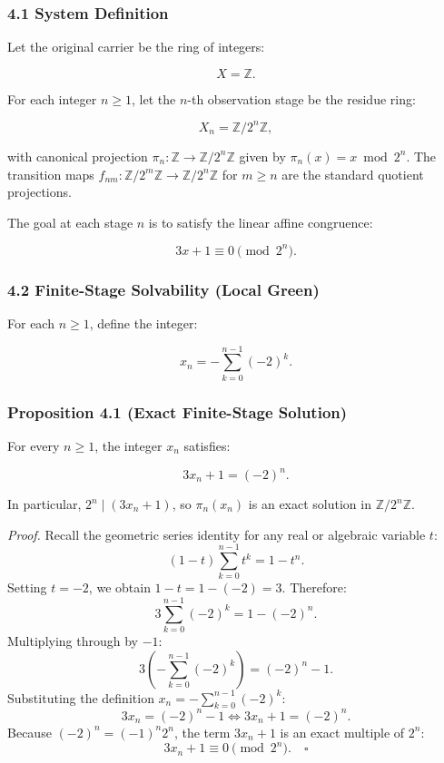 \documentclass[
  11pt,
]{article}
\theoremstyle{plain}
\theoremstyle{definition}\newtheorem{definition}[theorem]{Definition}
\theoremstyle{remark}\newtheorem*{remark}{Remark}
\begin{document}
\subsubsection{4.1 System Definition}\label{system-definition}

Let the original carrier be the ring of integers:

\[
X = \mathbb{Z}.
\]

For each integer \(n \ge 1\), let the \(n\)-th observation stage be the
residue ring:

\[
X_n = \mathbb{Z}/2^n\mathbb{Z},
\]

with canonical projection
\(\pi_n: \mathbb{Z} \to \mathbb{Z}/2^n\mathbb{Z}\) given by
\(\pi_n(x) = x \bmod 2^n\). The transition maps
\(f_{nm}: \mathbb{Z}/2^m\mathbb{Z} \to \mathbb{Z}/2^n\mathbb{Z}\) for
\(m \ge n\) are the standard quotient projections.

The goal at each stage \(n\) is to satisfy the linear affine congruence:

\[
3x + 1 \equiv 0 \pmod{2^n}.
\]

\subsubsection{4.2 Finite-Stage Solvability (Local
Green)}\label{finite-stage-solvability-local-green}

For each \(n \ge 1\), define the integer:

\[
x_n = -\sum_{k=0}^{n-1} (-2)^k.
\]

\subsubsection{Proposition 4.1 (Exact Finite-Stage
Solution)}\label{proposition-4.1-exact-finite-stage-solution}

For every \(n \ge 1\), the integer \(x_n\) satisfies:

\[
3x_n + 1 = (-2)^n.
\]

In particular, \(2^n \mid (3x_n + 1)\), so \(\pi_n(x_n)\) is an exact
solution in \(\mathbb{Z}/2^n\mathbb{Z}\).

\emph{Proof.} Recall the geometric series identity for any real or
algebraic variable \(t\): \[
(1 - t)\sum_{k=0}^{n-1} t^k = 1 - t^n.
\] Setting \(t = -2\), we obtain \(1 - t = 1 - (-2) = 3\). Therefore: \[
3 \sum_{k=0}^{n-1} (-2)^k = 1 - (-2)^n.
\] Multiplying through by \(-1\): \[
3 \left( -\sum_{k=0}^{n-1} (-2)^k \right) = (-2)^n - 1.
\] Substituting the definition \(x_n = -\sum_{k=0}^{n-1} (-2)^k\): \[
3x_n = (-2)^n - 1 \iff 3x_n + 1 = (-2)^n.
\] Because \((-2)^n = (-1)^n 2^n\), the term \(3x_n + 1\) is an exact
multiple of \(2^n\): \[
3x_n + 1 \equiv 0 \pmod{2^n}. \quad \square
\]
\end{document}
